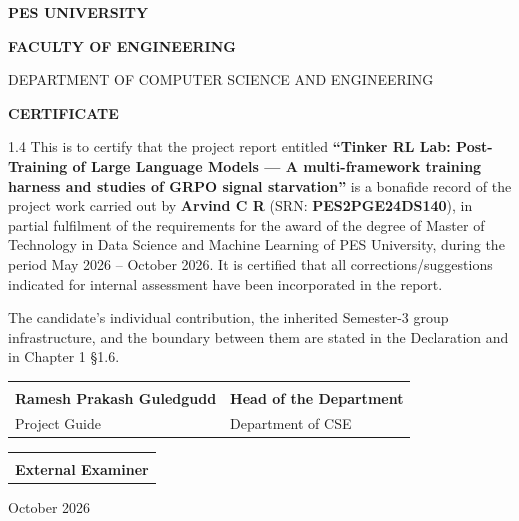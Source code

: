 \documentclass[12pt,a4paper]{report}
\begin{document}
\begin{titlepage}
\centering
\thispagestyle{empty}
\vspace*{0.1in}
{\Large\bfseries PES UNIVERSITY\par}
\vspace{0.2in}
{\large\bfseries FACULTY OF ENGINEERING\par}
{\normalsize DEPARTMENT OF COMPUTER SCIENCE AND ENGINEERING\par}
\vspace{0.35in}
{\Large\bfseries CERTIFICATE\par}
\vspace{0.5in}
\begin{spacing}{1.4}
\noindent This is to certify that the project report entitled
\textbf{``Tinker RL Lab: Post-Training of Large Language Models --- A
multi-framework training harness and studies of GRPO signal starvation''} is a
bonafide record of the project work carried out by
\textbf{Arvind C R} (SRN: \textbf{PES2PGE24DS140}), in partial fulfilment of
the requirements for the award of the degree of Master of Technology in
Data Science and Machine Learning of PES University, during the period
May 2026 -- October 2026. It is certified that all corrections/suggestions
indicated for internal assessment have been incorporated in the report.

\vspace{0.3in}
The candidate's individual contribution, the inherited Semester-3 group
infrastructure, and the boundary between them are stated in the Declaration
and in Chapter 1 \S1.6.
\end{spacing}
\vspace{0.4in}
\noindent\begin{tabular}{@{}p{2.4in}p{2.4in}@{}}
\dotfill & \dotfill \\
\textbf{Ramesh Prakash Guledgudd} & \textbf{Head of the Department} \\
Project Guide & Department of CSE \\
\end{tabular}
\vspace{0.3in}
\noindent\begin{tabular}{@{}p{2.4in}@{}}
\dotfill \\
\textbf{External Examiner} \\
\end{tabular}
\vfill
{\normalsize October 2026\par}
\end{titlepage}
\end{document}
